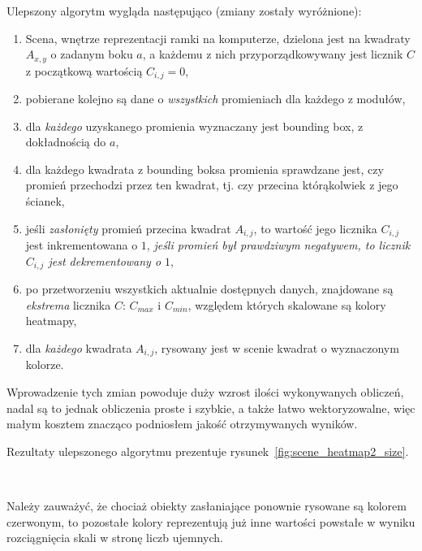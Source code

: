Ulepszony algorytm wygląda następująco (zmiany zostały wyróżnione):
\begin{enumerate}
 \item Scena, wnętrze reprezentacji ramki na komputerze, dzielona jest na kwadraty $A_{x,y}$ o zadanym boku $a$, a każdemu z nich przyporządkowywany jest licznik $C$ z początkową wartością $C_{i,j} = 0$,
 \item pobierane kolejno są dane o \textit{wszystkich} promieniach dla każdego z modułów,
 \item dla \textit{każdego} uzyskanego promienia wyznaczany jest bounding box, z dokładnością do $a$,
 \item dla każdego kwadrata z bounding boksa promienia sprawdzane jest, czy promień przechodzi przez ten kwadrat, tj. czy przecina którąkolwiek z jego ścianek,
 \item jeśli \textit{zasłonięty} promień przecina kwadrat $A_{i,j}$, to wartość jego licznika $C_{i,j}$ jest inkrementowana o $1$, \textit{jeśli promień był prawdziwym negatywem, to licznik $C_{i,j}$ jest dekrementowany o $1$},
 \item po przetworzeniu wszystkich aktualnie dostępnych danych, znajdowane są \textit{ekstrema} licznika $C$: $C_{max}$ i $C_{min}$, względem których skalowane są kolory heatmapy,
 \item dla \textit{każdego} kwadrata $A_{i,j}$, rysowany jest w scenie kwadrat o wyznaczonym kolorze.\\
\end{enumerate}

Wprowadzenie tych zmian powoduje duży wzrost ilości wykonywanych obliczeń, nadal są to jednak obliczenia proste i szybkie, a także łatwo wektoryzowalne, więc małym kosztem znacząco podniosłem jakość otrzymywanych wyników.

Rezultaty ulepszonego algorytmu prezentuje rysunek~\ref{fig:scene_heatmap2_size}.

\begin{sidewaysfigure}[tbh]
  \myfloatalign
   \quad
   \\
   \quad
  \caption[Wpływ wielkości $a$ na ulepszony algorytm konstrukcji heatmapy.]{Wpływ wielkości $a$ na ulepszony algorytm konstrukcji heatmapy.}\label{fig:scene_heatmap2_size}
\end{sidewaysfigure}

Należy zauważyć, że chociaż obiekty zasłaniające ponownie rysowane są kolorem czerwonym, to pozostałe kolory reprezentują już inne wartości powstałe w wyniku rozciągnięcia skali w stronę liczb ujemnych.
